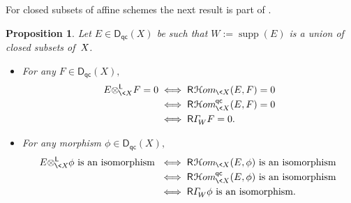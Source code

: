\documentclass{compositio}
\theoremstyle{plain}
\newtheorem{prop}[thm]{Proposition}
\theoremstyle{definition}
\theoremstyle{remark}
\numberwithin{equation}{thm}
\begin{document}
For closed subsets of affine schemes the next result is part of \cite [Proposition 6.5]{DG}.

\begin{prop}\label{Hom and tensor 0} 
Let\/  $E\in{{\boldsymbol{\mathsf{D}}}_{\mathsf{qc}}}(X)$ be such that $W:=\operatorname{supp}(E)$ is  a union of closed subsets of\/~$X{\mkern-1mu}$. 
\begin{itemize}
\item[\rm(i)]
For any\/ $F\in{{\boldsymbol{\mathsf{D}}}_{\mathsf{qc}}}(X),${} 
\begin{align*}
E{\otimes^{\mathsf L}_{{{\mkern-1mu}\<X}}}F=0&\iff{\mathsf R}{\mkern1mu}{{\mathcal H} om}_{{{\mkern-1mu}\<X}}(E,F)=0\\
&\iff {{\mathsf R}{\mkern1mu}{{\mathcal H} om}_{{{\mkern-1mu}\<X}}^{{\mkern-1mu}{\mathsf{qc}}}}(E,F)=0\\
&\iff{\mathsf R}{\varGamma}^{}_{\!W}F=0.
\end{align*}
\item[\rm(ii)]
For any morphism\/ $\phi\in{{\boldsymbol{\mathsf{D}}}_{\mathsf{qc}}}(X),${} 
\begin{align*}
E{\otimes^{\mathsf L}_{{{\mkern-1mu}\<X}}}{\mkern-1mu}\phi\textup{ is an isomorphism }
&\iff {\mathsf R}{\mkern1mu}{{\mathcal H} om}_{{{\mkern-1mu}\<X}}(E,\phi)\textup{ is an isomorphism }\\
&\iff {{\mathsf R}{\mkern1mu}{{\mathcal H} om}_{{{\mkern-1mu}\<X}}^{{\mkern-1mu}{\mathsf{qc}}}}(E,\phi)\textup{ is an isomorphism }\\
&\iff {\mathsf R}{\varGamma}^{}_{\!W}\phi\textup{ is an isomorphism.}
\end{align*}
\end{itemize}
\end{prop}
\end{document}
